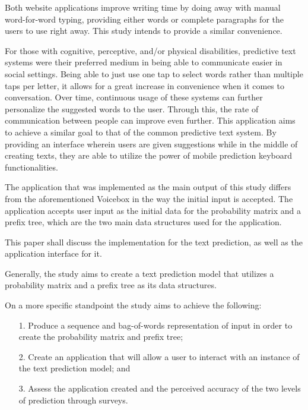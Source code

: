 \documentclass[journal]{./IEEE/IEEEtran}
\begin{document}
Both website applications improve writing time by doing away with manual word-for-word typing, providing either words or complete paragraphs for the users to use right away. This study intends to provide a similar convenience.

For those with cognitive, perceptive, and/or physical disabilities, predictive text systems were their preferred medium in being able to communicate easier in social settings. \cite{GV2006} Being able to just use one tap to select words rather than multiple taps per letter, it allows for a great increase in convenience when it comes to conversation. Over time, continuous usage of these systems can further personalize the suggested words to the user. Through this, the rate of communication between people can improve even further. This application aims to achieve a similar goal to that of the common predictive text system. By providing an interface wherein users are given suggestions while in the middle of creating texts, they are able to utilize the power of mobile prediction keyboard functionalities.

The application that was implemented as the main output of this study differs from the aforementioned Voicebox in the way the initial input is accepted. The application accepts user input as the initial data for the probability matrix and a prefix tree, which are the two main data structures used for the application.

This paper shall discuss the implementation for the text prediction, as well as the application interface for it.

Generally, the study aims to create a text prediction model that utilizes a probability matrix and a prefix tree as its data structures.

On a more specific standpoint the study aims to achieve the following:
\begin{enumerate}{}

\item[1.] Produce a sequence and bag-of-words representation of input in order to create the probability matrix and prefix tree;

\item[2.] Create an application that will allow a user to interact with an instance of the text prediction model; and

\item[3.] Assess the application created and the perceived accuracy of the two levels of prediction through surveys.

\end{enumerate}
\end{document}
